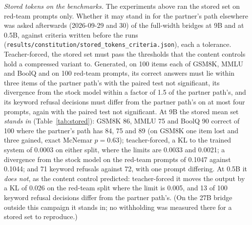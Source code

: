 \documentclass[11pt]{article}
\newcommand{\code}[1]{\texttt{#1}}
\begin{document}
\emph{Stored tokens on the benchmarks.} The experiments above ran the stored set
on red-team prompts only. Whether it may stand in for the partner's path
elsewhere was asked afterwards (2026-09-29 and 30) of the full-width bridges at
9B and at 0.5B, against criteria written before the runs
(\code{results/\allowbreak{}constitution/\allowbreak{}stored\_\allowbreak{}tokens\_\allowbreak{}criteria.json}),
each a tolerance. Teacher-forced, the stored set must pass the thresholds that the
content controls hold a compressed variant to. Generated, on 100 items each of
GSM8K, MMLU and BoolQ and on 100 red-team prompts, its correct answers must lie
within three items of the partner path's with the paired test not significant,
its divergence from the stock model within a factor of 1.5 of the partner path's,
and its keyword refusal decisions must differ from the partner path's on at most
four prompts, again with the paired test not significant. At 9B the stored mean
set \emph{stands in} (Table~\ref{tab:stored}): GSM8K 86, MMLU 75 and BoolQ 90
correct of 100 where the partner's path has 84, 75 and 89 (on GSM8K one item lost
and three gained, exact McNemar $p = 0.63$); teacher-forced, a KL to the trained
system of 0.0003 on either split, where the limits are 0.0033 and 0.0021; a
divergence from the stock model on the red-team prompts of 0.1047 against 0.1044;
and 71 keyword refusals against 72, with one prompt differing. At 0.5B it
\emph{does not}, as the content control predicted: teacher-forced it moves the
output by a KL of 0.026 on the red-team split where the limit is 0.005, and 13 of
100 keyword refusal decisions differ from the partner path's. (On the 27B bridge
outside this campaign it stands in; no withholding was measured there for a stored
set to reproduce.)
\end{document}
